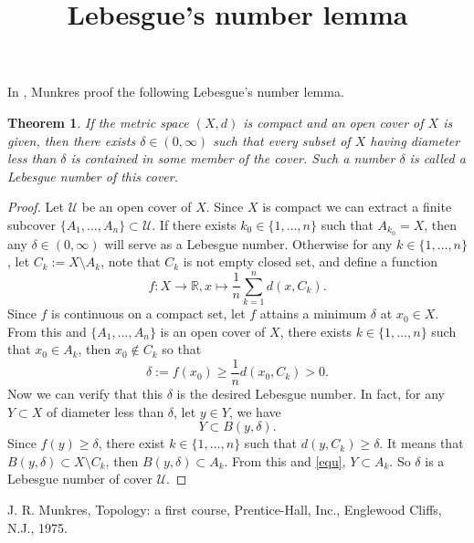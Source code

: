\documentclass[a4paper,12pt]{article}
\title{Lebesgue's number lemma}
\author{}
\date{}
\newtheorem{theorem}{Theorem}
\begin{document}
\maketitle

In \cite[Lemma 7.2]{m75}, Munkres proof the following Lebesgue's number lemma.

\begin{theorem}
    If the metric space $ (X, d) $ is compact and an open cover of $ X $ is given, 
    then there exists $ \delta \in (0, \infty) $ such that every subset of $ X $ 
    having diameter less than $ \delta $ is contained in some member of the cover.
    Such a number $ \delta $ is called a Lebesgue number of this cover. 
\end{theorem}

\begin{proof}
    Let $ \mathcal{U} $ be an open cover of $ X $. Since $ X $ is compact 
    we can extract a finite subcover $ \{A_{1},\dots ,A_{n}\} \subset \mathcal{U} $. 
    If there exists $ k_0 \in \{1, \ldots, n\} $ such that $ A_{k_0} = X $, 
    then any $ \delta \in (0, \infty) $ will serve as a Lebesgue number. 
    Otherwise for any $ k \in \{1, \dots, n\} $, let $ C_k := X \setminus A_k $, 
    note that $ C_k $ is not empty closed set, and define a function
    $$
        f: X \rightarrow \mathbb{R}, x \mapsto \frac{1}{n} \sum_{k = 1}^n d(x, C_k).
    $$
    Since $ f $ is continuous on a compact set, let $ f $ attains a minimum $ \delta $ at $ x_0 \in X $. 
    From this and $ \{A_1, \dots, A_n\} $ is an open cover of $ X $, there exists $ k \in \{1, \ldots, n\} $ 
    such that $ x_0 \in A_k $, then $ x_0 \notin C_k $ so that
    $$
        \delta := f(x_0) \geq \frac{1}{n} d(x_0, C_k) > 0.
    $$
    Now we can verify that this $ \delta $ is the desired Lebesgue number. 
    In fact, for any $ Y \subset X $ of diameter less than $ \delta $, let $ y \in Y $, we have 
    \begin{equation} \label{equ}
        Y \subset B(y, \delta).
    \end{equation} 
    Since $ f(y) \geq \delta $, there exist $ k \in \{1, \ldots, n\} $ 
    such that $ d(y, C_k) \geq \delta $. It means that $ B(y, \delta) \subset X \setminus C_k $,
    then $ B(y, \delta) \subset A_k $. From this and \eqref{equ}, $ Y \subset A_k $. 
    So $ \delta $ is a Lebesgue number of cover $ \mathcal{U} $.
\end{proof}

\begin{thebibliography}{99}

     J. R. Munkres, Topology: a first course, Prentice-Hall, Inc., Englewood Cliffs, N.J.,  1975.
    
\end{thebibliography}
\end{document}
